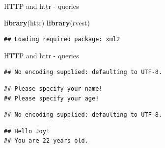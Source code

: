 \documentclass[ignorenonframetext,]{beamer}
\newenvironment{Shaded}{\begin{snugshade}}{\end{snugshade}}
\newcommand{\KeywordTok}[1]{\textcolor[rgb]{0.13,0.29,0.53}{\textbf{{#1}}}}
\newcommand{\DataTypeTok}[1]{\textcolor[rgb]{0.13,0.29,0.53}{{#1}}}
\newcommand{\StringTok}[1]{\textcolor[rgb]{0.31,0.60,0.02}{{#1}}}
\newcommand{\NormalTok}[1]{{#1}}
\begin{document}
\begin{frame}[fragile]{HTTP and httr - queries}

\begin{Shaded}
\begin{Highlighting}[]
\KeywordTok{library}\NormalTok{(httr)}
\KeywordTok{library}\NormalTok{(rvest)}
\end{Highlighting}
\end{Shaded}

\begin{verbatim}
## Loading required package: xml2
\end{verbatim}

\end{frame}

\begin{frame}[fragile]{HTTP and httr - queries}

\begin{Shaded}
\end{Shaded}

\begin{verbatim}
## No encoding supplied: defaulting to UTF-8.
\end{verbatim}

\begin{verbatim}
## Please specify your name!
## Please specify your age!
\end{verbatim}

\begin{Shaded}
\end{Shaded}

\begin{verbatim}
## No encoding supplied: defaulting to UTF-8.
\end{verbatim}

\begin{verbatim}
## Hello Joy!
## You are 22 years old.
\end{verbatim}

\end{frame}
\end{document}
